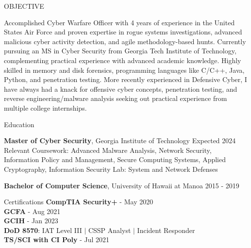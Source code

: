 \documentclass{resume} %
\begin{document}

\begin{rSection}{OBJECTIVE}

{Accomplished Cyber Warfare Officer with 4 years of experience in the United States Air Force and proven expertise in rogue systems investigations, advanced malicious cyber activity detection, and agile methodology-based hunts. Currently pursuing an MS in Cyber Security from Georgia Tech Institute of Technology, complementing practical experience with advanced academic knowledge. Highly skilled in  memory and disk forensics, programming languages like C/C++, Java, Python, and penetration testing. More recently experienced in Defensive Cyber, I have always had a knack for offensive cyber concepts, penetration testing, and reverse engineering/malware analysis seeking out practical experience from multiple college internships.}


\end{rSection}

\begin{rSection}{Education}

{\bf Master of Cyber Security}, Georgia Institute of Technology \hfill {Expected 2024}\\
Relevant Coursework: Advanced Malware Analysis, Network Security, Information Policy and Management, Secure Computing Systems, Applied Cryptography, 
Information Security Lab: System and Network Defenses

{\bf Bachelor of Computer Science}, University of Hawaii at Manoa \hfill {2015 - 2019}
\end{rSection}

\begin{rSection}{Certifications}
{\bf  CompTIA Security+} - May 2020 \\
{\bf  GCFA} - Aug 2021 \\
{\bf  GCIH} - Jan 2023 \\
{\bf  DoD 8570}: IAT Level III $|$ CSSP Analyst $|$ Incident Responder \\
{\bf  TS/SCI with CI Poly} - Jul 2021 \\ 

\end{rSection}
\end{document}
